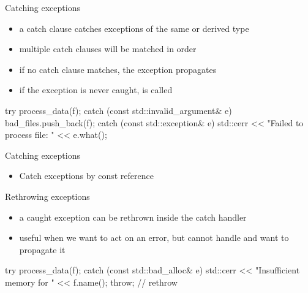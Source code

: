 \begin{frame}[fragile]
  \begin{block}{Catching exceptions}
    \begin{itemize}
      \item a catch clause catches exceptions of the same or derived type
      \item multiple catch clauses will be matched in order
      \item if no catch clause matches, the exception propagates
      \item if the exception is never caught,  is called
    \end{itemize}
  \end{block}
  \begin{cppcode}
    try {
      process_data(f);
    } catch (const std::invalid_argument& e) {
      bad_files.push_back(f);
    } catch (const std::exception& e) {
      std::cerr << "Failed to process file: " << e.what();
    }
  \end{cppcode}
  \begin{goodpractice}{Catching exceptions}
    \begin{itemize}
      \item Catch exceptions by const reference
    \end{itemize}
  \end{goodpractice}
\end{frame}

\begin{frame}[fragile]
  \begin{block}{Rethrowing exceptions}
    \begin{itemize}
      \item a caught exception can be rethrown inside the catch handler
      \item useful when we want to act on an error, but cannot handle and want to propagate it
    \end{itemize}
  \end{block}
  \begin{cppcode}
    try {
      process_data(f);
    } catch (const std::bad_alloc& e) {
      std::cerr << "Insufficient memory for " << f.name();
      throw; // rethrow
    }
  \end{cppcode}
\end{frame}

